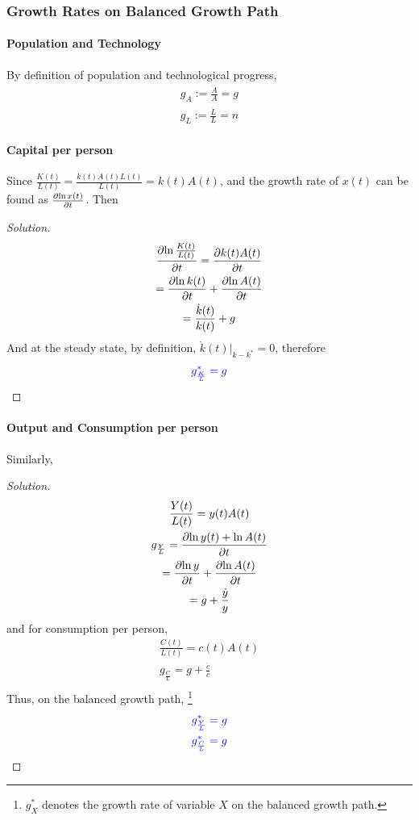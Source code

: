 \documentclass[]{article}
\begin{document}
			\subsubsection{Growth Rates on Balanced Growth Path}
			\paragraph{Population and Technology} By definition of population and technological progress,
			\begin{gather}
				g_A := \frac{\dot{A}}{A} = g \\
				g_L := \frac{\dot{L}}{L} = n
			\end{gather}
			
			\paragraph{Capital per person} Since $\frac{K(t)}{L(t)} = \frac{k(t)A(t)L(t)}{L(t)} = k(t)A(t)$, and the growth rate of $x(t)$ can be found as $\frac{\partial{\ln{x(t)}}}{\partial{t}}$. Then
			\begin{proof}[Solution]
				\begin{gather*}
					\frac{\partial{\ln{\frac{K(t)}{L(t)}}}}{\partial{t}} = \frac{\partial{k(t)A(t)}}{\partial{t}} \\
					= \frac{\partial{\ln{k(t)}}}{\partial{t}} + \frac{\partial{\ln{A(t)}}}{\partial{t}} \\
					= \frac{\dot{k}(t)}{k(t)} + g \\
				\end{gather*}
				And at the steady state, by definition, $\dot{k}(t)|_{k-k^*} = 0$, therefore 
				\begin{equation}
					\textcolor{blue}{
						g_{\frac{K}{L}}^* = g
					}
				\end{equation}
			\end{proof}
			
			\paragraph{Output and Consumption per person} Similarly,
			\begin{proof}[Solution]
				\begin{gather*}
					\frac{Y(t)}{L(t)} = y(t)A(t) \\
					g_{\frac{Y}{L}} = \frac{\partial{\ln{y(t)} + \ln{A(t)}}}{\partial{t}} \\
					= \frac{\partial{\ln{y}}}{\partial{t}} + \frac{\partial{\ln{A(t)}}}{\partial{t}} \\
					= g + \frac{\dot{y}}{y}
				\end{gather*}
				and for consumption per person,
				\begin{gather*}
					\frac{C(t)}{L(t)} = c(t)A(t)\\
					g_{\frac{C}{L}} = g + \frac{\dot{c}}{c} \\
				\end{gather*}
				Thus, on the balanced growth path, \footnote{$g_X^*$ denotes the growth rate of variable $X$ on the balanced growth path.}
				\begin{gather}
					\textcolor{blue}{
						g_{\frac{Y}{L}}^* = g
					}
					\\
					\textcolor{blue}{
						g_{\frac{C}{L}}^* = g
					}
				\end{gather}
			\end{proof}
			
\end{document}
